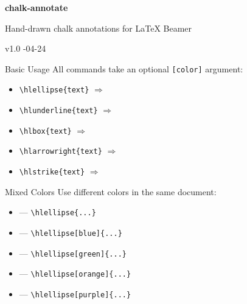\documentclass[aspectratio=169, 11pt]{beamer}
\begin{document}
\begin{frame}[c]
  \centering
  {\Large\bfseries chalk-annotate}\par
  \vspace{0.5em}
  {\normalsize Hand-drawn chalk annotations for \LaTeX{} Beamer}\par
  \vspace{0.5em}
  {\small\color{gray} v1.0 -04-24}
\end{frame}

\begin{frame}{Basic Usage}
  All commands take an optional \texttt{[color]} argument:

  \vspace{1em}
  \begin{itemize}\setlength{\itemsep}{0.6em}
    \item \texttt{\textbackslash hlellipse\{text\}}
          \quad$\Rightarrow$\quad {}
    \item \texttt{\textbackslash hlunderline\{text\}}
          \quad$\Rightarrow$\quad {}
    \item \texttt{\textbackslash hlbox\{text\}}
          \quad$\Rightarrow$\quad {}
    \item \texttt{\textbackslash hlarrowright\{text\}}
          \quad$\Rightarrow$\quad {}
    \item \texttt{\textbackslash hlstrike\{text\}}
          \quad$\Rightarrow$\quad {}
  \end{itemize}
\end{frame}

\begin{frame}{Mixed Colors}
  Use different colors in the same document:

  \vspace{1em}
  \begin{itemize}\setlength{\itemsep}{0.8em}
    \item {} — \texttt{\textbackslash hlellipse\{...\}}
    \item {} — \texttt{\textbackslash hlellipse[blue]\{...\}}
    \item {} — \texttt{\textbackslash hlellipse[green]\{...\}}
    \item {} — \texttt{\textbackslash hlellipse[orange]\{...\}}
    \item {} — \texttt{\textbackslash hlellipse[purple]\{...\}}
  \end{itemize}
\end{frame}
\end{document}
